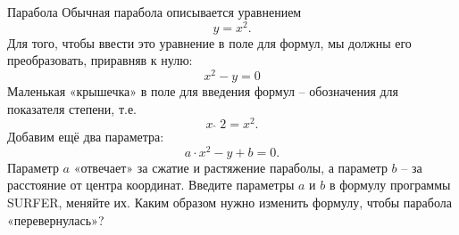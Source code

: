 \begin{surferPage}{Парабола}
Обычная парабола описывается уравнением \[y=x^2.\]
Для того, чтобы ввести это уравнение в поле для формул, мы должны его преобразовать, приравняв к нулю:
\[x^2-y=0\]
Маленькая «крышечка» в поле для введения формул – обозначения для показателя степени, т.е.
\[ x  \,\hat{\ } \, 2 =x^2.\]
Добавим ещё два параметра:
\[a \cdot x^2-y+b=0.\]
Параметр $a$ «отвечает» за сжатие и растяжение параболы, а параметр $b$ – за расстояние от центра координат.
\newline
Введите параметры $a$ и $b$ в формулу программы SURFER, меняйте их. Каким образом нужно изменить формулу, чтобы парабола «перевернулась»?
\end{surferPage}

